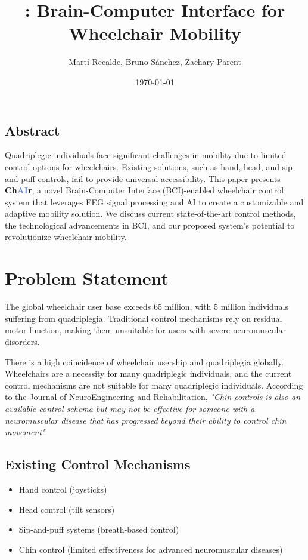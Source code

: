 \documentclass[a4paper]{article}
\title{\chair: Brain-Computer Interface for Wheelchair Mobility}
\author{Mart\'i Recalde, Bruno S\'anchez, Zachary Parent}
\date{\today}
\newcommand\chair{\textbf{Ch\textcolor[HTML]{6B8ACD}{AI}r}\xspace}
\begin{document}
\begin{titlepage}
    \maketitle
    \vspace{2cm}
    \tableofcontents
    \section{Abstract}
    Quadriplegic individuals face significant challenges in mobility due to
    limited control options for wheelchairs. Existing solutions, such as hand,
    head, and sip-and-puff controls, fail to provide universal accessibility.
    This paper presents \chair, a novel Brain-Computer Interface (BCI)-enabled
    wheelchair control system that leverages EEG signal processing and AI to
    create a customizable and adaptive mobility solution. We discuss current
    state-of-the-art control methods, the technological advancements in BCI,
    and our proposed system's potential to revolutionize wheelchair mobility.    
\end{titlepage}


\section{Problem Statement}

The global wheelchair user base exceeds 65 million, with 5 million individuals
suffering from quadriplegia. Traditional control mechanisms rely on residual
motor function, making them unsuitable for users with severe neuromuscular disorders. 

There is a high coincidence of wheelchair usership and quadriplegia globally.
Wheelchairs are a necessity for many quadriplegic individuals, and the current
control mechanisms are not suitable for many quadriplegic individuals.
According to the Journal of NeuroEngineering and Rehabilitation,
\textit{"Chin controls is also an
available control schema but may not be effective
for someone with a neuromuscular disease
that has progressed beyond their ability to
control chin movement"} \cite{neurorehab}

\subsection{Existing Control Mechanisms}
\begin{itemize}
    \item Hand control (joysticks)
    \item Head control (tilt sensors)
    \item Sip-and-puff systems (breath-based control)
    \item Chin control (limited effectiveness for advanced neuromuscular diseases)
\end{itemize}
\end{document}
